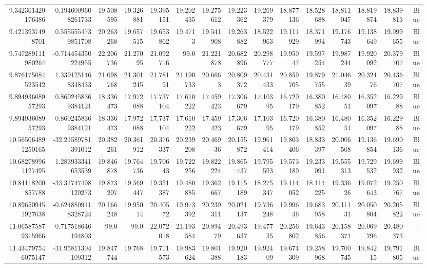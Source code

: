 \begin{center}
\begin{longtable}{rrrrrrrrrrrrrrr}
9.342361420176386 & -0.1946009608261733 & 19.508595 & 19.326881 & 19.395151 & 19.202435 & 19.275612 & 19.223362 & 19.269379 & 18.877136 & 18.528688 & 18.811047 & 18.819874 & 18.839813 & Blue \\
9.4213937498701 & 0.5555554739851708 & 20.263268 & 19.657515 & 19.653862 & 19.4713 & 19.541908 & 19.263882 & 18.522963 & 19.111929 & 18.371994 & 19.176743 & 19.138649 & 19.099655 & Blue \\
9.747289111980264 & -0.714454350224955 & 22.206736 & 21.27095 & 21.092716 & 99.0 & 21.221878 & 20.682896 & 20.298777 & 19.95047 & 19.597254 & 19.987244 & 19.920092 & 20.379707 & Blue \\
9.876175084523542 & 1.3391251468348433 & 21.098768 & 21.301245 & 21.78191 & 21.190733 & 20.6663 & 20.809372 & 20.431433 & 20.859705 & 19.879755 & 21.04639 & 20.32476 & 20.436707 & Blue \\
9.89493608957293 & 0.8602458369384121 & 18.336473 & 17.972088 & 17.737104 & 17.610222 & 17.459423 & 17.306679 & 17.10395 & 16.720179 & 16.380852 & 16.48051 & 16.352097 & 16.22988 & Blue \\
9.89493608957293 & 0.8602458369384121 & 18.336473 & 17.972088 & 17.737104 & 17.610222 & 17.459423 & 17.306679 & 17.10395 & 16.720179 & 16.380852 & 16.48051 & 16.352097 & 16.22988 & Blue \\
10.565064891250165 & -32.21589781391012 & 20.382261 & 20.361912 & 20.376337 & 20.239208 & 20.46936 & 20.155872 & 19.961414 & 19.803406 & 18.833397 & 20.006508 & 19.136854 & 19.690136 & Blue \\
10.682789961127495 & 1.283933341653539 & 19.846878 & 19.764736 & 19.70643 & 19.722256 & 19.822224 & 19.865437 & 19.795593 & 19.573189 & 19.233091 & 19.555313 & 19.729532 & 19.699932 & Blue \\
10.84118200857788 & -33.31747498120273 & 19.873207 & 19.569447 & 19.351387 & 19.480885 & 19.362667 & 19.115189 & 18.275347 & 19.114052 & 18.114225 & 19.33626 & 19.072643 & 19.250767 & Blue \\
10.896509451927638 & -0.6248809118328724 & 20.166248 & 19.95014 & 20.40572 & 19.973392 & 20.239311 & 20.021137 & 19.736248 & 19.99646 & 19.683958 & 20.11131 & 20.050804 & 20.205822 & Blue \\
11.065875879315966 & -0.717518646194803 & 99.0 & 99.0 & 22.072018 & 21.193584 & 20.89479 & 20.493637 & 19.47735 & 20.256802 & 19.643856 & 20.158371 & 20.069796 & 20.480373 & - \\
11.434797546075147 & -31.95811304109312 & 19.847744 & 19.768 & 19.711573 & 19.983624 & 19.801388 & 19.920183 & 19.92409 & 19.674309 & 19.258968 & 19.700745 & 19.84215 & 19.791805 & Blue \\

\end{longtable}
\end{center}
